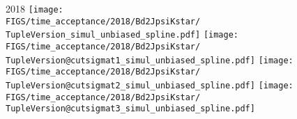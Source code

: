 \begin{frame}
  2018
  \texttt{[image: \\FIGS/time\_acceptance/2018/Bd2JpsiKstar/\\TupleVersion\_simul\_unbiased\_spline.pdf]}
  \texttt{[image: \\FIGS/time\_acceptance/2018/Bd2JpsiKstar/\\TupleVersion@cutsigmat1\_simul\_unbiased\_spline.pdf]}
  \texttt{[image: \\FIGS/time\_acceptance/2018/Bd2JpsiKstar/\\TupleVersion@cutsigmat2\_simul\_unbiased\_spline.pdf]}
  \texttt{[image: \\FIGS/time\_acceptance/2018/Bd2JpsiKstar/\\TupleVersion@cutsigmat3\_simul\_unbiased\_spline.pdf]}

\end{frame} %



